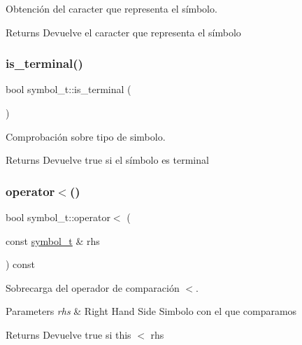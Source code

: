 Obtención del caracter que representa el símbolo. 

\begin{DoxyReturn}{Returns}
Devuelve el caracter que representa el símbolo 
\end{DoxyReturn}
\mbox{\label{classsymbol__t_a916bb3bc6598f17d505dbf2cfaf03b00}} 
\subsubsection{\texorpdfstring{is\+\_\+terminal()}{is\_terminal()}}
{\footnotesize\ttfamily bool symbol\+\_\+t\+::is\+\_\+terminal (\begin{DoxyParamCaption}{ }\end{DoxyParamCaption})\hspace{0.3cm}{\ttfamily [inline]}}



Comprobación sobre tipo de simbolo. 

\begin{DoxyReturn}{Returns}
Devuelve true si el símbolo es terminal 
\end{DoxyReturn}
\mbox{\label{classsymbol__t_aeb4035229b7724a7394a97e9f3e5d8d7}} 
\subsubsection{\texorpdfstring{operator$<$()}{operator<()}}
{\footnotesize\ttfamily bool symbol\+\_\+t\+::operator$<$ (\begin{DoxyParamCaption}\item[{const \hyperlink{classsymbol__t}{symbol\+\_\+t} \&}]{rhs }\end{DoxyParamCaption}) const}



Sobrecarga del operador de comparación $<$. 


\begin{DoxyParams}{Parameters}
{\em rhs} & Right Hand Side Simbolo con el que comparamos \\
\hline
\end{DoxyParams}
\begin{DoxyReturn}{Returns}
Devuelve true si this $<$ rhs 
\end{DoxyReturn}
\mbox{\label{classsymbol__t_a28a877d02d2d132b42e41ae0a52230c7}} 
